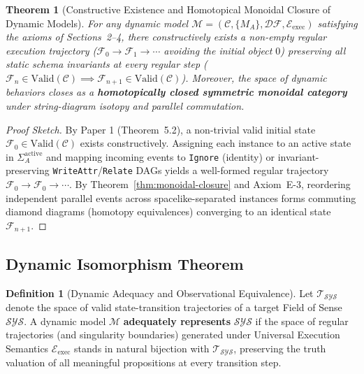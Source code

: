 \documentclass[11pt,a4paper]{article}
\theoremstyle{definition}
\newtheorem{definition}{Definition}[section]
\theoremstyle{plain}
\newtheorem{theorem}{Theorem}[section]
\theoremstyle{remark}
\newcommand{\Valid}{\mathrm{Valid}}
\newcommand{\DF}{\mathcal{DF}}
\begin{document}
\begin{theorem}[Constructive Existence and Homotopical Monoidal Closure of Dynamic Models]\label{thm:dyn-exist}
For any dynamic model $\mathcal{M} = (\mathcal{C}, \{M_A\}, \DF, \mathcal{E}_{\mathrm{exec}})$ satisfying the axioms of Sections~2--4, there constructively exists a non-empty regular execution trajectory ($\mathcal{F}_0 \to \mathcal{F}_1 \to \cdots$ avoiding the initial object $0$) preserving all static schema invariants at every regular step ($\mathcal{F}_n \in \Valid(\mathcal{C}) \implies \mathcal{F}_{n+1} \in \Valid(\mathcal{C})$). Moreover, the space of dynamic behaviors closes as a \textbf{homotopically closed symmetric monoidal category} under string-diagram isotopy and parallel commutation.
\end{theorem}

\begin{proof}[Proof Sketch]
By Paper 1 (Theorem~5.2), a non-trivial valid initial state $\mathcal{F}_0 \in \Valid(\mathcal{C})$ exists constructively. Assigning each instance to an active state in $\Sigma_A^{\mathrm{active}}$ and mapping incoming events to \texttt{Ignore} (identity) or invariant-preserving \texttt{WriteAttr}/\texttt{Relate} DAGs yields a well-formed regular trajectory $\mathcal{F}_0 \to \mathcal{F}_0 \to \cdots$. By Theorem~\ref{thm:monoidal-closure} and Axiom~E-3, reordering independent parallel events across spacelike-separated instances forms commuting diamond diagrams (homotopy equivalences) converging to an identical state $\mathcal{F}_{n+1}$.
\end{proof}

\subsection{Dynamic Isomorphism Theorem}

\begin{definition}[Dynamic Adequacy and Observational Equivalence]\label{def:dyn-adeq}
Let $\mathcal{T}_{\mathcal{SYS}}$ denote the space of valid state-transition trajectories of a target Field of Sense $\mathcal{SYS}$. A dynamic model $\mathcal{M}$ \textbf{adequately represents} $\mathcal{SYS}$ if the space of regular trajectories (and singularity boundaries) generated under Universal Execution Semantics $\mathcal{E}_{\mathrm{exec}}$ stands in natural bijection with $\mathcal{T}_{\mathcal{SYS}}$, preserving the truth valuation of all meaningful propositions at every transition step.
\end{definition}
\end{document}
